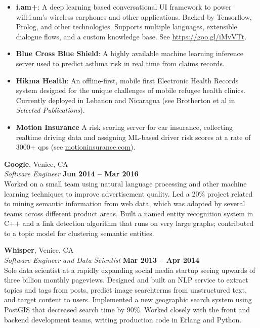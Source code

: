 \documentclass[margin,line]{resume}
\begin{document}
\begin{resume}
    \begin{itemize}
    \item \textbf{i.am+}: A deep learning based conversational UI framework to power
      will.i.am's wireless earphones and other applications. Backed by
      Tensorflow, Prolog, and other technologies. Supports multiple languages,
      extensible dialogue flows, and a custom knowledge base. See
      \url{https://goo.gl/iMvVTt}.
    \item \textbf{Blue Cross Blue Shield}: A highly available machine learning
      inference server used to predict asthma risk in real time from claims
      records.
    \item \textbf{Hikma Health}: An offline-first, mobile first Electronic
      Health Records system designed for the unique challenges of mobile refugee
      health clinics. Currently deployed in Lebanon and Nicaragua (see
      Brotherton et al in \emph{Selected Publications}).
    \item \textbf{Motion Insurance} A risk scoring server for car insurance,
      collecting realtime driving data and assigning ML-based
      driver risk scores at a rate of 3000+ qps (see \url{motioninsurance.com}).

    \end{itemize}

    \pagebreak

    \textbf{Google}, Venice, CA \vspace{2mm}\\\vspace{1mm}%
    \textsl{Software Engineer} \hfill \textbf{Jun 2014 -- Mar 2016}\\
    Worked on a small team using natural language processing and other machine
    learning techniques to improve advertisement quality. Led a 20\% project
    related to mining semantic information from web data, which was adopted by
    several teams across different product areas. Built a named entity
    recognition system in C++ and a link detection algorithm that runs on very
    large graphs; contributed to a topic model for clustering semantic entities.

    \textbf{Whisper}, Venice, CA \vspace{2mm}\\\vspace{1mm}%
    \textsl{Software Engineer and Data Scientist} \hfill \textbf{Mar 2013 -- Apr 2014}\\
    Sole data scientist at a rapidly expanding social media startup
    seeing upwards of three billion monthly pageviews. Designed and built an NLP
    service to extract topics and tags from posts, predict image searchterms
    from unstructured text, and target content to users. Implemented a new
    geographic search system using PostGIS that decreased search time by
    90\%. Worked closely with the front and backend development teams, writing
    production code in Erlang and Python.


\end{resume}
\end{document}
